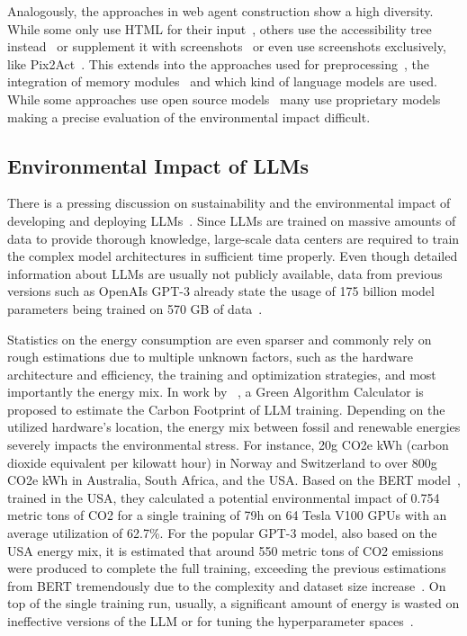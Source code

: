 Analogously, the approaches in web agent construction show a high diversity. While some only use HTML for their input~\cite{ma2023laser, deng2024mind2web}, others use the accessibility tree instead~\cite{dechezelles2024browsergymecosystemwebagent} or supplement it with screenshots~\cite{zheng2024gpt} or even use screenshots exclusively, like Pix2Act~\cite{lu2024weblinx}. This extends into the approaches used for preprocessing~\cite{deng2024mind2web,gur2023real}, the integration of memory modules~\cite{ma2023laser} and which kind of language models are used. While some approaches use open source models~\cite{deng2024mind2web,gur2023real} many use proprietary models~\cite{ma2023laser, zheng2024gpt,yang2024agentoccamsimplestrongbaseline,zhang2024webpilotversatileautonomousmultiagent} making a precise evaluation of the environmental impact difficult.


\subsection{Environmental Impact of LLMs}
\label{sec:enviroment}
There is a pressing discussion on sustainability and the environmental impact of developing and deploying LLMs~\cite{bender2021dangers}.
Since LLMs are trained on massive amounts of data to provide thorough knowledge, large-scale data centers are required to train the complex model architectures in sufficient time properly.
Even though detailed information about LLMs are usually not publicly available, data from previous versions such as OpenAIs GPT-3 already state the usage of 175 billion model parameters being trained on 570 GB of data~\cite{brown2020language}.

Statistics on the energy consumption are even sparser and commonly rely on rough estimations due to multiple unknown factors, such as the hardware architecture and efficiency, the training and optimization strategies, and most importantly the energy mix.
In work by ~\citet{lannelongue2021green}, a Green Algorithm Calculator is proposed to estimate the Carbon Footprint of LLM training.
Depending on the utilized hardware's location, the energy mix between fossil and renewable energies severely impacts the environmental stress. For instance, 20g CO2e kWh (carbon dioxide
equivalent per kilowatt hour) in Norway and Switzerland to over 800g CO2e kWh in Australia, South Africa, and the USA.
Based on the BERT model~\cite{devlin2018bert}, trained in the USA, they calculated a potential environmental impact of 0.754 metric tons of CO2 for a single training of 79h on 64 Tesla V100 GPUs with an average utilization of 62.7\%.
For the popular GPT-3 model, also based on the USA energy mix, it is estimated that around 550 metric tons of CO2 emissions were produced to complete the full training, exceeding the previous estimations from BERT tremendously due to the complexity and dataset size increase~\cite{shi2023thinking}.
On top of the single training run, usually, a significant amount of energy is wasted on ineffective versions of the LLM or for tuning the hyperparameter spaces~\cite{Verdecchia2023A}.


